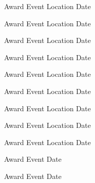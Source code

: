 \begin{cvhonors}

  \cvhonor
    {Award} %
    {Event} %
    {Location} %
    {Date} %

  \cvhonor
    {Award} %
    {Event} %
    {Location} %
    {Date} %

  \cvhonor
    {Award} %
    {Event} %
    {Location} %
    {Date} %

  \cvhonor
    {Award} %
    {Event} %
    {Location} %
    {Date} %

  \cvhonor
    {Award} %
    {Event} %
    {Location} %
    {Date} %

  \cvhonor
    {Award} %
    {Event} %
    {Location} %
    {Date} %

  \cvhonor
    {Award} %
    {Event} %
    {Location} %
    {Date} %

  \cvhonor
    {Award} %
    {Event} %
    {Location} %
    {Date} %

  \cvhonor
    {Award} %
    {Event} %
    {Location} %
    {Date} %

\end{cvhonors}



\begin{cvhonors}

  \cvhonor
    {Award} %
    {Event} %
    {} %
    {Date} %

  \cvhonor
    {Award} %
    {Event} %
    {} %
    {Date} %

\end{cvhonors}
